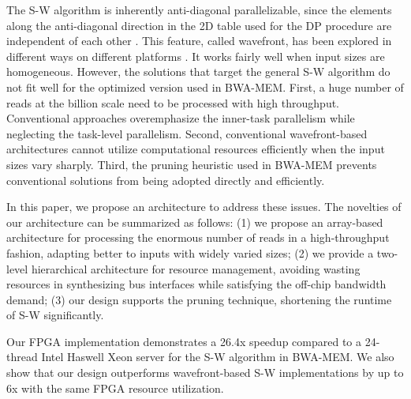 The S-W algorithm is inherently anti-diagonal parallelizable, since the elements along the anti-diagonal direction in the 2D table used for the DP procedure are independent of each other \cite{Edmiston1988}. 
This feature, called wavefront, has been explored in different ways on different platforms \cite{Preusser2012}\cite{RaceLogic}\cite{Zhang2007}\cite{Lam2013}. 
It works fairly well when input sizes are homogeneous. 
However, the solutions that target the general S-W algorithm do not fit well for the optimized version used in BWA-MEM. 
First, a huge number of reads at the billion scale need to be processed with high throughput. 
Conventional approaches overemphasize the inner-task parallelism while neglecting the task-level parallelism. 
Second, conventional wavefront-based architectures cannot utilize computational resources efficiently when the input sizes vary sharply. 
Third, the pruning heuristic used in BWA-MEM prevents conventional solutions from being adopted directly and efficiently.

In this paper, we propose an architecture to address these issues.
The novelties of our architecture can be summarized as follows: 
(1) we propose an array-based architecture for processing the enormous number of reads in a high-throughput fashion, adapting better to inputs with widely varied sizes; 
(2) we provide a two-level hierarchical architecture for resource management, avoiding wasting resources in synthesizing bus interfaces while satisfying the off-chip bandwidth demand;
(3) our design supports the pruning technique, shortening the runtime of S-W significantly. 

Our FPGA implementation demonstrates a 26.4x speedup compared to a 24-thread Intel Haswell Xeon server for the S-W algorithm in BWA-MEM. 
We also show that our design outperforms wavefront-based S-W implementations by up to 6x with the same FPGA resource utilization.
